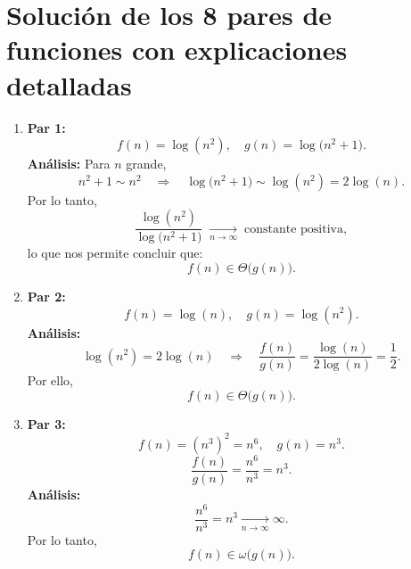 \documentclass[12pt]{article}
\begin{document}
\section*{Solución de los 8 pares de funciones con explicaciones detalladas}


\begin{enumerate}

  \item \textbf{Par 1:} 
  \[
    f(n) = \log(n^2), \quad g(n) = \log\bigl(n^2 + 1\bigr).
  \]
  \textbf{Análisis:} Para \(n\) grande,
  \[
    n^2 + 1 \sim n^2 \quad \Longrightarrow \quad \log\bigl(n^2 + 1\bigr) \sim \log(n^2) = 2\log(n).
  \]
  Por lo tanto,
  \[
    \frac{\log(n^2)}{\log\bigl(n^2 + 1\bigr)} \; \xrightarrow[n \to \infty]{} \; \text{constante positiva},
  \]
  lo que nos permite concluir que:
  \[
    f(n) \in \Theta\bigl(g(n)\bigr).
  \]

  \item \textbf{Par 2:} 
  \[
    f(n) = \log(n), \quad g(n) = \log(n^2).
  \]
  \textbf{Análisis:}
  \[
    \log(n^2)= 2\log(n) \quad \Longrightarrow \quad \frac{f(n)}{g(n)} = \frac{\log(n)}{2\log(n)} = \frac{1}{2}.
  \]
  Por ello,
  \[
    f(n) \in \Theta\bigl(g(n)\bigr).
  \]

  \item \textbf{Par 3:} 
  \[
    f(n) = (n^3)^2 = n^6, \quad g(n) = n^3.
  \]
  \[
    \frac{f(n)}{g(n)} = \frac{n^6}{n^3} = n^3.
  \]
  \textbf{Análisis:}
  \[
    \frac{n^6}{n^3} = n^3 \xrightarrow[n \to \infty]{} \infty.
  \]
  Por lo tanto,
  \[
    f(n) \in \omega\bigl(g(n)\bigr).
  \]


\end{enumerate}
\end{document}
